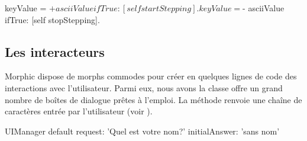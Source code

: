 \documentclass[a4paper,10pt,twoside]{book}
\begin{document}

\begin{code}{}
	keyValue = $+ asciiValue 
		ifTrue: [self startStepping].
	keyValue = $- asciiValue
		ifTrue: [self stopStepping].
\end{code}


\subsection{Les interacteurs} %

Morphic dispose de morphs commodes pour créer en quelques lignes de
code des interactions avec l'utilisateur. Parmi eux, nous avons la
classe  offre un grand nombre de boîtes de
dialogue %
prêtes à l'emploi.
La méthode  renvoie
une chaîne de caractères entrée par l'utilisateur (voir
).
\begin{code}{} %
UIManager default request: 'Quel est votre nom?' initialAnswer: 'sans nom'
\end{code}
\end{document}
